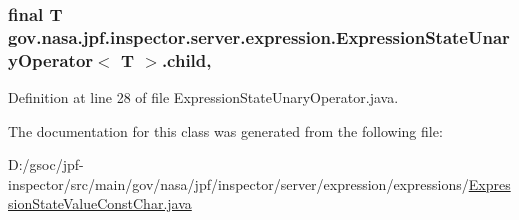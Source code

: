 \subsubsection[{\texorpdfstring{child}{child}}]{\setlength{\rightskip}{0pt plus 5cm}final T {\bf gov.\+nasa.\+jpf.\+inspector.\+server.\+expression.\+Expression\+State\+Unary\+Operator}$<$ T $>$.child\hspace{0.3cm}{\ttfamily [protected]}, {\ttfamily [inherited]}}\hypertarget{classgov_1_1nasa_1_1jpf_1_1inspector_1_1server_1_1expression_1_1_expression_state_unary_operator_a66041b1f569a361549e28a00f7ca5f2f}{}\label{classgov_1_1nasa_1_1jpf_1_1inspector_1_1server_1_1expression_1_1_expression_state_unary_operator_a66041b1f569a361549e28a00f7ca5f2f}


Definition at line 28 of file Expression\+State\+Unary\+Operator.\+java.



The documentation for this class was generated from the following file\+:\begin{DoxyCompactItemize}
\item 
D\+:/gsoc/jpf-\/inspector/src/main/gov/nasa/jpf/inspector/server/expression/expressions/\hyperlink{_expression_state_value_const_char_8java}{Expression\+State\+Value\+Const\+Char.\+java}\end{DoxyCompactItemize}
